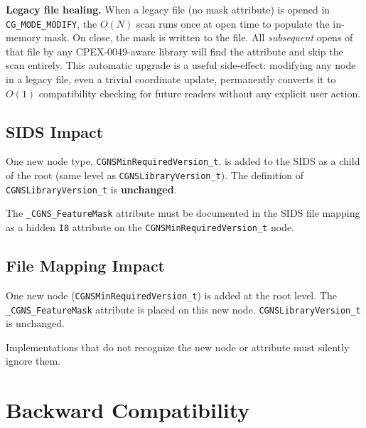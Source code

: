 \documentclass[11pt,letterpaper]{article}
\begin{document}
\textbf{Legacy file healing.}  When a legacy file (no mask attribute)
is opened in \texttt{CG\_MODE\_MODIFY}, the $O(N)$ scan runs once at
open time to populate the in-memory mask.  On close, the mask is
written to the file.  All \emph{subsequent} opens of that file by
any CPEX-0049-aware library will find the attribute and skip the scan
entirely.  This automatic upgrade is a useful side-effect: modifying
any node in a legacy file, even a trivial coordinate update,
permanently converts it to $O(1)$ compatibility checking for future
readers without any explicit user action.

\subsection{SIDS Impact}

One new node type, \texttt{CGNSMinRequiredVersion\_t}, is added to
the SIDS as a child of the root (same level as
\texttt{CGNSLibraryVersion\_t}).  The definition of
\texttt{CGNSLibraryVersion\_t} is \textbf{unchanged}.

\medskip
\noindent{}
\medskip

The \texttt{\_CGNS\_FeatureMask} attribute must be documented in the
SIDS file mapping as a hidden \texttt{I8} attribute on the
\texttt{CGNSMinRequiredVersion\_t} node.

\subsection{File Mapping Impact}
\label{sec:file-mapping}

One new node (\texttt{CGNSMinRequiredVersion\_t}) is added at the
root level.  The \texttt{\_CGNS\_FeatureMask} attribute is placed on
this new node.  \texttt{CGNSLibraryVersion\_t} is unchanged.

Implementations that do not recognize the new node or attribute must
silently ignore them.

\section{Backward Compatibility}
\end{document}
